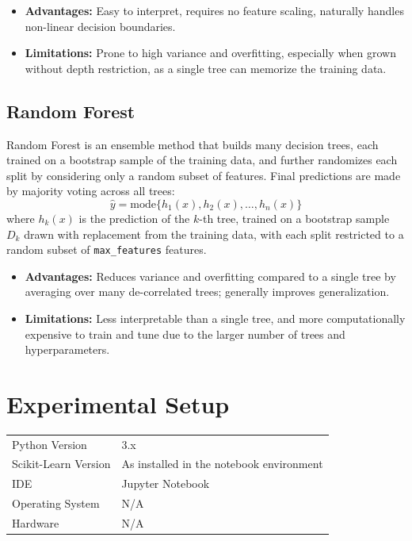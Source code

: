 \documentclass[12pt,a4paper]{article}
\begin{document}
\begin{itemize}[nosep]
\item \textbf{Advantages:} Easy to interpret, requires no feature scaling, naturally handles non-linear decision boundaries.
\item \textbf{Limitations:} Prone to high variance and overfitting, especially when grown without depth restriction, as a single tree can memorize the training data.
\end{itemize}

\subsection{Random Forest}
Random Forest is an ensemble method that builds many decision trees, each trained on a bootstrap sample of the training data, and further randomizes each split by considering only a random subset of features. Final predictions are made by majority voting across all trees:
\begin{equation}
\hat{y} = \text{mode}\{h_1(x), h_2(x), \dots, h_n(x)\}
\end{equation}
where $h_k(x)$ is the prediction of the $k$-th tree, trained on a bootstrap sample $D_k$ drawn with replacement from the training data, with each split restricted to a random subset of \texttt{max\_features} features.

\begin{itemize}[nosep]
\item \textbf{Advantages:} Reduces variance and overfitting compared to a single tree by averaging over many de-correlated trees; generally improves generalization.
\item \textbf{Limitations:} Less interpretable than a single tree, and more computationally expensive to train and tune due to the larger number of trees and hyperparameters.
\end{itemize}

\section{Experimental Setup}
\begin{tabular}{ll}
\toprule
Python Version & 3.x \\
Scikit-Learn Version & As installed in the notebook environment \\
IDE & Jupyter Notebook \\
Operating System & N/A \\
Hardware & N/A \\
\bottomrule
\end{tabular}
\end{document}
